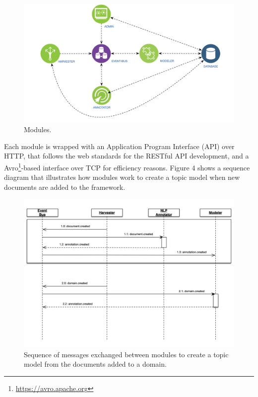 \begin{figure} 
  \center
  \includegraphics[scale=0.45]{modules}
  \caption{Modules.}
  \label{fig:librairy-modules}
\end{figure}


Each module is wrapped with an Application Program Interface (API) over HTTP, that follows the web standards for the RESTful API development, and a Avro\footnote{\url{https://avro.apache.org}}-based interface over TCP for efficiency reasons. Figure 4 shows a sequence diagram that illustrates how modules work to create a topic model when new documents are added to the framework. 

\begin{figure} 
  \center
  \includegraphics[scale=0.45]{librairy-sequence.png}
  \caption{Sequence of messages exchanged between modules to create a topic model from the documents added to a domain.}
  \label{fig:librairy-modules}
\end{figure}




